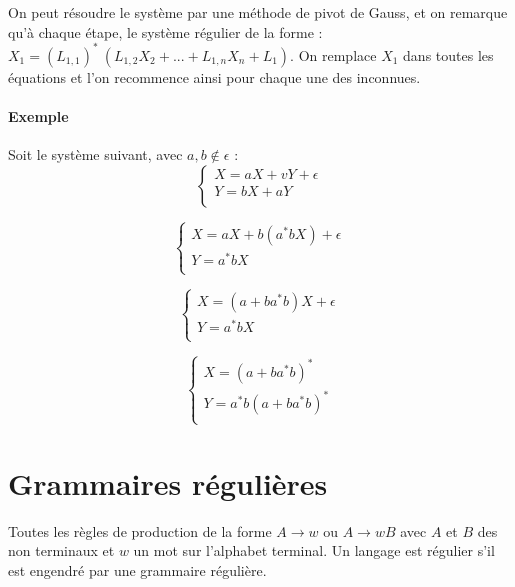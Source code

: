 On peut résoudre le système par une méthode de pivot de Gauss, et on remarque qu'à chaque étape, le système régulier de la forme : $X_1 = (L_{1,1})^*\ (L_{1,2} X_2 + ... + L_{1,n} X_n + L_1)$. On remplace $X_1$ dans toutes les équations et l'on recommence ainsi pour chaque une des inconnues.



\paragraph{Exemple} %
\label{par:exemple}

Soit le système suivant, avec $a,b \not \in \epsilon$ :\\
\[
   \left \{
   \begin{array}{cc}
  		X = aX + vY + \epsilon\\
    	Y = bX + aY\\
   \end{array}
   \right .
\]

\[
   \left \{
   \begin{array}{cc}
  		X = aX + b(a^*bX) + \epsilon\\
    	Y = a^*bX\\
   \end{array}
   \right .
\]

\[
   \left \{
   \begin{array}{cc}
  		X = (a+ba^*b)X + \epsilon\\
    	Y = a^*bX\\
   \end{array}
   \right .
\]

\[
   \left \{
   \begin{array}{cc}
  		X = (a+ba^*b)^*\\
    	Y = a^*b(a+ba^*b)^*\\
   \end{array}
   \right .
\]




\section{Grammaires régulières} %
\label{sec:grammaires_r_guli_res}

Toutes les règles de production de la forme $A \rightarrow w$ ou $A \rightarrow wB$ avec $A$ et $B$ des non terminaux et $w$ un mot sur l'alphabet terminal. Un langage est régulier s'il est engendré par une grammaire régulière.



